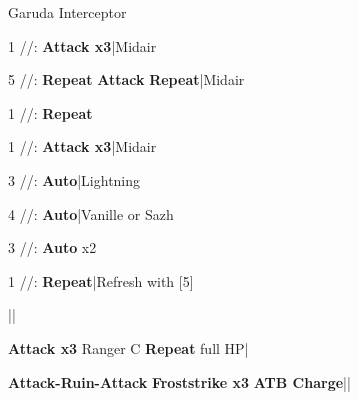 \begin{fight}{Garuda Interceptor}
	\item [1] \com/\rav/\rav: \textbf{Attack x3}|Midair
	\item [5] \com/\rav/\rav: \textbf{Repeat} \to \textbf{Attack} \to \textbf{Repeat}|Midair
	\item [1] \com/\rav/\rav: \textbf{Repeat}
	\item {}
	\item [1] \com/\rav/\rav: \textbf{Attack x3}|Midair
	\item [3] \rav/\rav/\rav: \textbf{Auto}|Lightning
	\item [4] \rav/\rav/\rav: \textbf{Auto}|Vanille or Sazh
	\item [3] \rav/\rav/\rav: \textbf{Auto} x2
	\item [1] \com/\rav/\rav: \textbf{Repeat}|Refresh with [5]
	\item \skip|\save|\skip
\end{fight}

\begin{mainlist}
	\item {} \textbf{Attack x3} Ranger C \to \textbf{Repeat} full HP|\skip
	\item {} \textbf{Attack-Ruin-Attack} \to \textbf{Froststrike x3} \to \textbf{ATB Charge}||\save
\end{mainlist}
